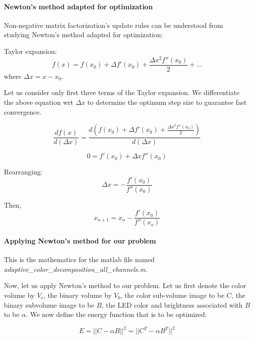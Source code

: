 \paragraph{Newton's method adapted for optimization}
Non-negative matrix factorization's update rules can be understood from studying Newton's method adapted for optimization:

Taylor expansion:
\begin{equation}
  f(x) = f(x_0) + \Delta f'(x_0) + \frac{\Delta x^2 f''(x_0)}{2} + ...
\end{equation}
where $\Delta x = x - x_0$.

Let us consider only first three terms of the Taylor expansion. We differentiate the above equation wrt $\Delta x$ to determine the optimum step size to guarantee fast convergence.

\begin{equation}
  \frac{d f(x)}{d(\Delta x)} = \frac{d \left( f(x_0) + \Delta f'(x_0) + \frac{\Delta x^2 f''(x_0)}{2}\right)}{d(\Delta x)} 
\end{equation}

\begin{equation}
  0 = f'(x_0) + \Delta x f''(x_0)
\end{equation}

Rearranging:
\begin{equation}
  \Delta x = - \frac{f'(x_0)}{f''(x_0)}
\end{equation}

Then,
\begin{equation}
  x_{n+1} = x_n - \frac{f'(x_0)}{f''(x_o)}
\end{equation}

\paragraph{Applying Newton's method for our problem}

This is the mathematics for the matlab file named \emph{adaptive\_color\_decomposition\_all\_channels.m}.

Now, let us apply Newton's method to our problem. Let us first denote the color volume by $V_c$, the
binary volume by $V_b$, the color sub-volume image to be $C$, the binary subvolume image to be
$B$, the LED color and brightness associated with $B$ to be $\alpha$. We now define the energy
function that is to be optimized:

\begin{equation}
  E = ||C - \alpha B||^2 = ||C^T - \alpha B^T||^2
\end{equation}

